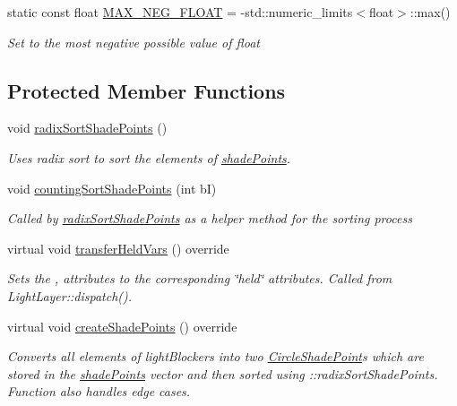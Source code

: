 \begin{DoxyCompactItemize}
\item 
static const float \hyperlink{classlighting_1_1CircleLightSource_a139a7246edba5531259b778ce0ca79b3}{M\+A\+X\+\_\+\+N\+E\+G\+\_\+\+F\+L\+O\+AT} = -\/std\+::numeric\+\_\+limits$<$float$>$\+::max()
\begin{DoxyCompactList}\small\item\em Set to the most negative possible value of float \end{DoxyCompactList}\end{DoxyCompactItemize}
\subsection*{Protected Member Functions}
\begin{DoxyCompactItemize}
\item 
void \hyperlink{classlighting_1_1CircleLightSource_a850ea8b5a1480473bd40a82a9687f229}{radix\+Sort\+Shade\+Points} ()
\begin{DoxyCompactList}\small\item\em Uses radix sort to sort the elements of \hyperlink{classlighting_1_1CircleLightSource_acdfea64be9d142f669338c5e206e753e}{shade\+Points}. \end{DoxyCompactList}\item 
void \hyperlink{classlighting_1_1CircleLightSource_ac7cbab4f6a38d8359a2637a875427e75}{counting\+Sort\+Shade\+Points} (int bI)
\begin{DoxyCompactList}\small\item\em Called by \hyperlink{classlighting_1_1CircleLightSource_a850ea8b5a1480473bd40a82a9687f229}{radix\+Sort\+Shade\+Points} as a helper method for the sorting process \end{DoxyCompactList}\item 
virtual void \hyperlink{classlighting_1_1CircleLightSource_afc39570a33c19b17fb8153be592b01e9}{transfer\+Held\+Vars} () override
\begin{DoxyCompactList}\small\item\em Sets the ,  attributes to the corresponding \char`\"{}held\char`\"{} attributes. Called from Light\+Layer\+::dispatch(). \end{DoxyCompactList}\item 
virtual void \hyperlink{classlighting_1_1CircleLightSource_aaa80bb9a9a27f3c74bf86cfd547d5f36}{create\+Shade\+Points} () override
\begin{DoxyCompactList}\small\item\em Converts all elements of {\itshape light\+Blockers}  into two \hyperlink{classlighting_1_1CircleShadePoint}{Circle\+Shade\+Point}s which are stored in the \hyperlink{classlighting_1_1CircleLightSource_acdfea64be9d142f669338c5e206e753e}{shade\+Points} vector and then sorted using \+::radix\+Sort\+Shade\+Points. Function also handles edge cases. \end{DoxyCompactList}\item 

\end{DoxyCompactItemize}
